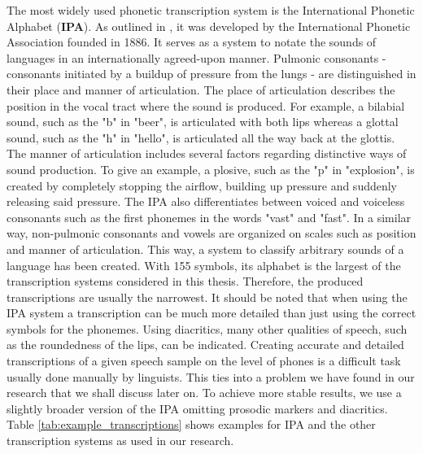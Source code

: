 The most widely used phonetic transcription system is the International Phonetic Alphabet (\textbf{IPA}). %
As outlined in \cite{ipa1999ipaHandbook}, it was developed by the International Phonetic Association founded in 1886.
It serves as a system to notate the sounds of languages in an internationally agreed-upon manner.
Pulmonic consonants - consonants initiated by a buildup of pressure from the lungs - are distinguished in their place and manner of articulation.
The place of articulation describes the position in the vocal tract where the sound is produced.
For example, a bilabial sound, such as the "b" in "beer", is articulated with both lips whereas a glottal sound, such as the "h" in "hello", is articulated all the way back at the glottis.  %
The manner of articulation includes several factors regarding distinctive ways of sound production.
To give an example, a plosive, such as the "p" in "explosion", is created by completely stopping the airflow, building up pressure and suddenly releasing said pressure.
The IPA also differentiates between voiced and voiceless consonants such as the first phonemes in the words "vast" and "fast".
In a similar way, non-pulmonic consonants and vowels are organized on scales such as position and manner of articulation.
This way, a system to classify arbitrary sounds of a language has been created.
With 155 symbols, its alphabet is the largest of the transcription systems considered in this thesis.
Therefore, the produced transcriptions are usually the narrowest.
It should be noted that when using the IPA system a transcription can be much more detailed than just using the correct symbols for the phonemes.
Using diacritics, many other qualities of speech, such as the roundedness of the lips, can be indicated.
Creating accurate and detailed transcriptions of a given speech sample on the level of phones is a difficult task usually done manually by linguists.
This ties into a problem we have found in our research that we shall discuss later on.
To achieve more stable results, we use a slightly broader version of the IPA omitting prosodic markers and diacritics. %
Table \ref{tab:example_transcriptions} shows examples for IPA and the other transcription systems as used in our research.\\


